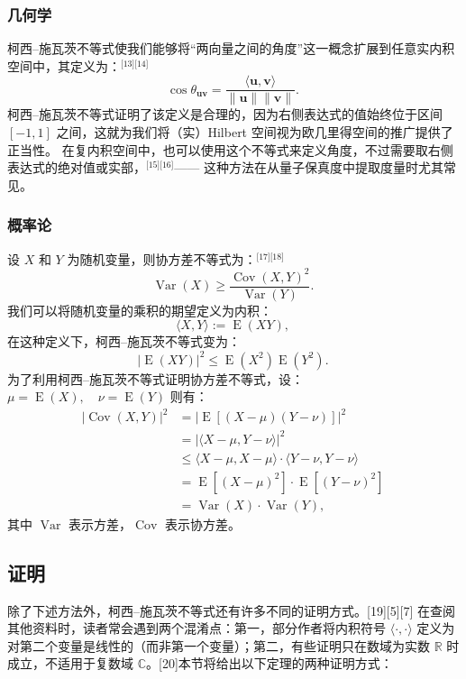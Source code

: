 \subsubsection{几何学}
柯西–施瓦茨不等式使我们能够将“两向量之间的角度”这一概念扩展到任意实内积空间中，其定义为：\(^\text{[13][14]}\)
$$
\cos \theta_{\mathbf{u}\mathbf{v}} = \frac{\langle \mathbf{u}, \mathbf{v} \rangle}{\|\mathbf{u}\| \|\mathbf{v}\|}.~
$$
柯西–施瓦茨不等式证明了该定义是合理的，因为右侧表达式的值始终位于区间 $[ -1, 1 ]$ 之间，这就为我们将（实）Hilbert 空间视为欧几里得空间的推广提供了正当性。
在复内积空间中，也可以使用这个不等式来定义角度，不过需要取右侧表达式的绝对值或实部，\(^\text{[15][16]}\)—— 这种方法在从量子保真度中提取度量时尤其常见。
\subsubsection{概率论}
设 $X$ 和 $Y$ 为随机变量，则协方差不等式为：\(^\text{[17][18]}\)
$$
\operatorname{Var}(X) \geq \frac{\operatorname{Cov}(X, Y)^2}{\operatorname{Var}(Y)}.~
$$
我们可以将随机变量的乘积的期望定义为内积：
$$
\langle X, Y \rangle := \operatorname{E}(XY),~
$$
在这种定义下，柯西–施瓦茨不等式变为：
$$
|\operatorname{E}(XY)|^2 \leq \operatorname{E}(X^2)\operatorname{E}(Y^2).~
$$
为了利用柯西–施瓦茨不等式证明协方差不等式，设：$\mu = \operatorname{E}(X), \quad \nu = \operatorname{E}(Y)$
则有：
$$
\begin{aligned}
|\operatorname{Cov}(X, Y)|^2 
&= |\operatorname{E}[(X - \mu)(Y - \nu)]|^2 \\
&= |\langle X - \mu, Y - \nu \rangle|^2 \\
&\leq \langle X - \mu, X - \mu \rangle \cdot \langle Y - \nu, Y - \nu \rangle \\
&= \operatorname{E}[(X - \mu)^2] \cdot \operatorname{E}[(Y - \nu)^2] \\
&= \operatorname{Var}(X) \cdot \operatorname{Var}(Y),
\end{aligned}~
$$
其中 $\operatorname{Var}$ 表示方差，$\operatorname{Cov}$ 表示协方差。
\subsection{证明}
除了下述方法外，柯西–施瓦茨不等式还有许多不同的证明方式。[19][5][7] 在查阅其他资料时，读者常会遇到两个混淆点：第一，部分作者将内积符号 $\langle \cdot, \cdot \rangle$ 定义为对第二个变量是线性的（而非第一个变量）；第二，有些证明只在数域为实数 $\mathbb{R}$ 时成立，不适用于复数域 $\mathbb{C}$。[20]本节将给出以下定理的两种证明方式：

